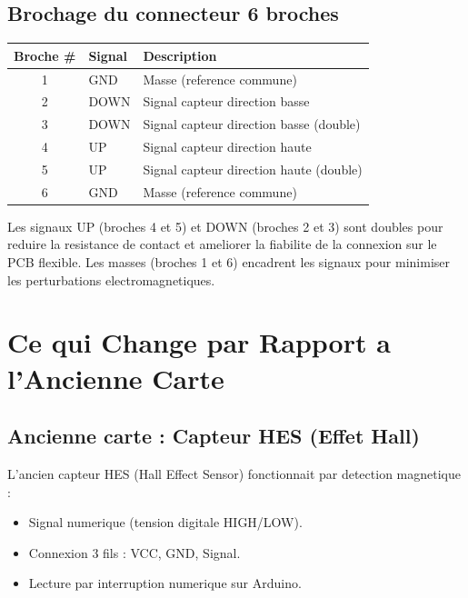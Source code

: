 \documentclass[12pt,a4paper]{article}
\begin{document}
\subsection{Brochage du connecteur 6 broches}

\begin{center}
\begin{tabular}{cll}
\toprule
\textbf{Broche \#} & \textbf{Signal} & \textbf{Description} \\
\midrule
1 & GND  & Masse (reference commune) \\
2 & DOWN & Signal capteur direction basse \\
3 & DOWN & Signal capteur direction basse (double) \\
4 & UP   & Signal capteur direction haute \\
5 & UP   & Signal capteur direction haute (double) \\
6 & GND  & Masse (reference commune) \\
\bottomrule
\end{tabular}
\end{center}

\begin{tcolorbox}[colback=green!5,colframe=green!50,title=Note sur le doublage des broches]
Les signaux UP (broches 4 et 5) et DOWN (broches 2 et 3) sont doubles pour
reduire la resistance de contact et ameliorer la fiabilite de la connexion sur
le PCB flexible. Les masses (broches 1 et 6) encadrent les signaux pour minimiser
les perturbations electromagnetiques.
\end{tcolorbox}

\section{Ce qui Change par Rapport a l'Ancienne Carte}

\subsection{Ancienne carte : Capteur HES (Effet Hall)}

L'ancien capteur HES (Hall Effect Sensor) fonctionnait par detection magnetique :
\begin{itemize}
  \item Signal numerique (tension digitale HIGH/LOW).
  \item Connexion 3 fils : VCC, GND, Signal.
  \item Lecture par interruption numerique sur Arduino.
\end{itemize}
\end{document}
